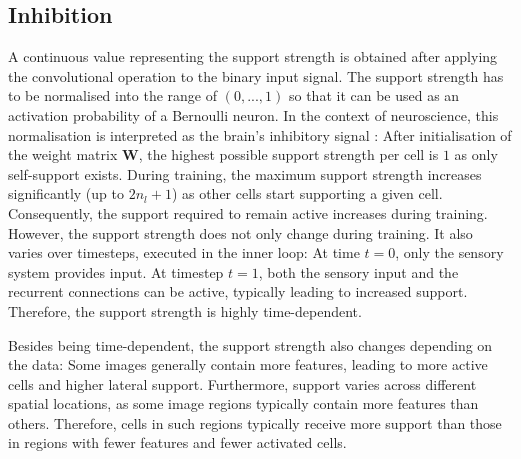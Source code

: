 \subsection{Inhibition}
A continuous value representing the support strength is obtained after applying the convolutional operation to the binary input signal.
The support strength has to be normalised into the range of $(0, ..., 1)$ so that it can be used as an activation probability of a Bernoulli neuron.
In the context of neuroscience, this normalisation is interpreted as the brain's inhibitory signal :
After initialisation of the weight matrix $\boldsymbol{W}$, the highest possible support strength per cell is $1$ as only self-support exists. During training, the maximum support strength increases significantly (up to $2n_l + 1$) as other cells start supporting a given cell.
Consequently, the support required to remain active increases during training.
However, the support strength does not only change during training. It also varies over timesteps, executed in the inner loop: At time $t=0$, only the sensory system provides input. At timestep $t=1$, both the sensory input and the recurrent connections can be active, typically leading to increased support. Therefore, the support strength is highly time-dependent.

Besides being time-dependent, the support strength also changes depending on the data:
Some images generally contain more features, leading to more active cells and higher lateral support. Furthermore, support varies across different spatial locations, as some image regions typically contain more features than others. Therefore, cells in such regions typically receive more support than those in regions with fewer features and fewer activated cells.

